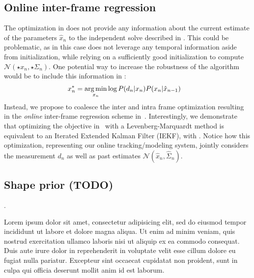 \subsection{Online inter-frame regression}
The optimization in  does not provide any information about the current estimate of the parameters $\hat{x}_n$ to the independent solve described in . This could be problematic, as in this case  does not leverage any temporal information aside from initialization, while relying on a sufficiently good initialization to compute $\mathcal{N}(\star{x}_n, \star{\Sigma}_n)$. One potential way to increase the robustness of the algorithm would be to include this information in :
% 
\begin{align}
x_n^* &= \operatorname*{arg\,min}_{x_n} \log  P(d_n|x_n) P(x_n |\hat{x}_{n - 1}) 
\label{eq:independenttemp}
\end{align}
% 
Instead, we propose to coalesce the inter and intra frame optimization resulting in the \emph{online} inter-frame regression scheme in~. Interestingly, we demonstrate that optimizing the objective in~ with a Levenberg-Marquardt method is equivalent to an Iterated Extended Kalman Filter (IEKF), with  .
% 
Notice how this optimization, representing our online tracking/modeling system, jointly considers the measurement $d_n$ as well as past estimates $\mathcal{N}(\hat{x}_n, \hat{\Sigma}_n)$.

\subsection{Shape prior (TODO)}
\label{sec:shapeprior}
. 
\begin{DRAFT}
Lorem ipsum dolor sit amet, consectetur adipisicing elit, sed do eiusmod tempor incididunt ut labore et dolore magna aliqua. Ut enim ad minim veniam, quis nostrud exercitation ullamco laboris nisi ut aliquip ex ea commodo consequat. Duis aute irure dolor in reprehenderit in voluptate velit esse cillum dolore eu fugiat nulla pariatur. Excepteur sint occaecat cupidatat non proident, sunt in culpa qui officia deserunt mollit anim id est laborum. 
\end{DRAFT}

